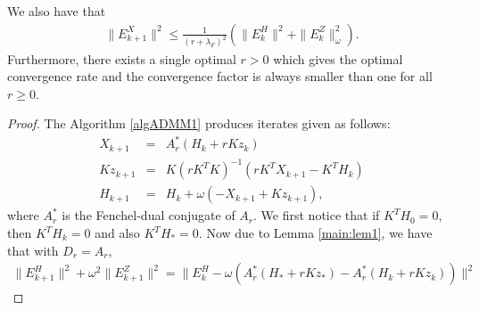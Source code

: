\begin{itemize}
\begin{theorem}
We also have that 
\begin{eqnarray*}
\|E_{k+1}^X\|^2 \leq \frac{1}{(r + \lambda_F)^2} \left ( \|E_k^H\|^2 + \|E_k^Z\|_\omega ^2 \right ). 
\end{eqnarray*}
Furthermore, there exists a single optimal $r > 0$ which gives the optimal convergence rate and the convergence factor is always smaller than one for all $r \geq 0$. 
\end{theorem}
\begin{proof} 
The Algorithm \ref{algADMM1} produces iterates given as follows: 
\begin{eqnarray*}
X_{k+1} &=& A_r^* (H_k + r K z_k) \\
Kz_{k+1} &=& K(rK^TK)^{-1} (rK^T X_{k+1} - K^TH_k) \\ 
H_{k+1} &=& H_k + \omega (-X_{k+1} + Kz_{k+1} ), 
\end{eqnarray*}
where $A_r^*$ is the Fenchel-dual conjugate of $A_r$. We first notice that if $K^TH_0 = 0$, then $K^TH_k = 0$ and also $K^TH_* = 0$. Now due to Lemma \ref{main:lem1}, we have that with $D_r = A_r$,  
\begin{eqnarray*}
\|E_{k+1}^H\|^2 + \omega^2 \|E_{k+1}^Z\|^2 = \|E_k^H - \omega (A_r^{*} (H_* + r K z_*) - A_r^{*} (H_k + r K z_k))\|^2 %
\end{eqnarray*}
\begin{comment} 
On the other hand, we have that 
\begin{eqnarray*}
X_{*} &=& A_r^{*} (H_* + r K z_*) \\
Kz_{*} &=& P_Z [A_r^{*}(H_* + rK z_*)] \\ 
H_{*} &=& H_* + \omega (-X_{*} + K z_{*}). 
\end{eqnarray*}
Therefore, we have the following error equation: 
\begin{eqnarray*}
X_{*} - X_{k+1} &=& A_r^{*} (H_* + r K z_*) - A_r^{*} (H_k + r K z_k) \\
Kz_{*} - Kz_{k+1} &=& P_Z [ A_r^{*} (H_* + rK z_*) - A_r^{*} (H_k + rK z_k) ]. 
\end{eqnarray*}

\end{comment}
\end{proof}
\end{itemize}

